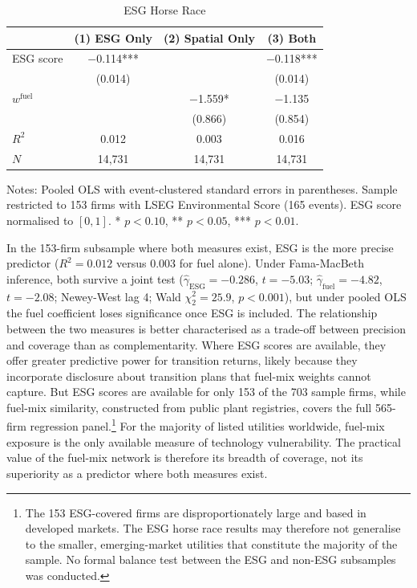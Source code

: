 \documentclass[12pt,a4paper]{article}
\begin{document}
\begin{table}[H]
\centering
\caption{ESG Horse Race}
\label{tab:esg_horserace}
\begin{tabular}{lccc}
\toprule
 & (1) ESG Only & (2) Spatial Only & (3) Both \\
\midrule
ESG score & $-$0.114*** & & $-$0.118*** \\
 & (0.014) & & (0.014) \\[4pt]
$w^{\text{fuel}}$ & & $-$1.559* & $-$1.135 \\
 & & (0.866) & (0.854) \\[4pt]
\midrule
$R^2$ & 0.012 & 0.003 & 0.016 \\
$N$ & 14{,}731 & 14{,}731 & 14{,}731 \\
\bottomrule
\end{tabular}
\begin{flushleft}\footnotesize
Notes: Pooled OLS with event-clustered standard errors in parentheses. Sample restricted to 153 firms with LSEG Environmental Score (165 events). ESG score normalised to $[0,1]$. * $p<0.10$, ** $p<0.05$, *** $p<0.01$.
\end{flushleft}
\end{table}

In the 153-firm subsample where both measures exist, ESG is the more precise predictor ($R^2 = 0.012$ versus $0.003$ for fuel alone). Under Fama-MacBeth inference, both survive a joint test ($\hat\gamma_{\mathrm{ESG}} = -0.286$, $t = -5.03$; $\hat\gamma_{\mathrm{fuel}} = -4.82$, $t = -2.08$; Newey-West lag 4; Wald $\chi^2_2 = 25.9$, $p < 0.001$), but under pooled OLS the fuel coefficient loses significance once ESG is included. The relationship between the two measures is better characterised as a trade-off between precision and coverage than as complementarity. Where ESG scores are available, they offer greater predictive power for transition returns, likely because they incorporate disclosure about transition plans that fuel-mix weights cannot capture. But ESG scores are available for only 153 of the 703 sample firms, while fuel-mix similarity, constructed from public plant registries, covers the full 565-firm regression panel.\footnote{The 153 ESG-covered firms are disproportionately large and based in developed markets. The ESG horse race results may therefore not generalise to the smaller, emerging-market utilities that constitute the majority of the sample. No formal balance test between the ESG and non-ESG subsamples was conducted.} For the majority of listed utilities worldwide, fuel-mix exposure is the only available measure of technology vulnerability. The practical value of the fuel-mix network is therefore its breadth of coverage, not its superiority as a predictor where both measures exist.
\end{document}
